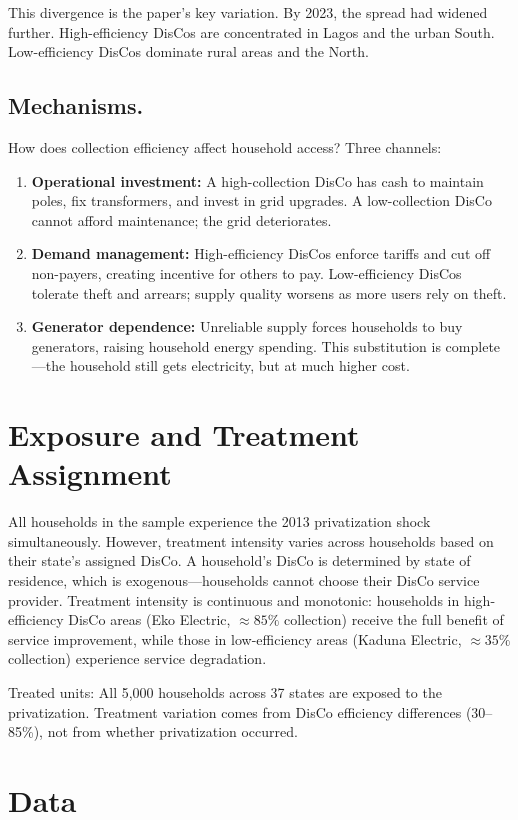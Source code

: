 \documentclass[12pt]{article}
\begin{document}
This divergence is the paper's key variation. By 2023, the spread had widened further. High-efficiency DisCos are concentrated in Lagos and the urban South. Low-efficiency DisCos dominate rural areas and the North.

\subsection*{Mechanisms.}
How does collection efficiency affect household access? Three channels:
\begin{enumerate}
\item \textbf{Operational investment:} A high-collection DisCo has cash to maintain poles, fix transformers, and invest in grid upgrades. A low-collection DisCo cannot afford maintenance; the grid deteriorates.
\item \textbf{Demand management:} High-efficiency DisCos enforce tariffs and cut off non-payers, creating incentive for others to pay. Low-efficiency DisCos tolerate theft and arrears; supply quality worsens as more users rely on theft.
\item \textbf{Generator dependence:} Unreliable supply forces households to buy generators, raising household energy spending. This substitution is complete---the household still gets electricity, but at much higher cost.
\end{enumerate}

\section{Exposure and Treatment Assignment}

All households in the sample experience the 2013 privatization shock simultaneously. However, treatment intensity varies across households based on their state's assigned DisCo. A household's DisCo is determined by state of residence, which is exogenous---households cannot choose their DisCo service provider. Treatment intensity is continuous and monotonic: households in high-efficiency DisCo areas (Eko Electric, $\approx 85\%$ collection) receive the full benefit of service improvement, while those in low-efficiency areas (Kaduna Electric, $\approx 35\%$ collection) experience service degradation.

Treated units: All 5,000 households across 37 states are exposed to the privatization. Treatment variation comes from DisCo efficiency differences (30--85\%), not from whether privatization occurred.

\section{Data}
\end{document}
